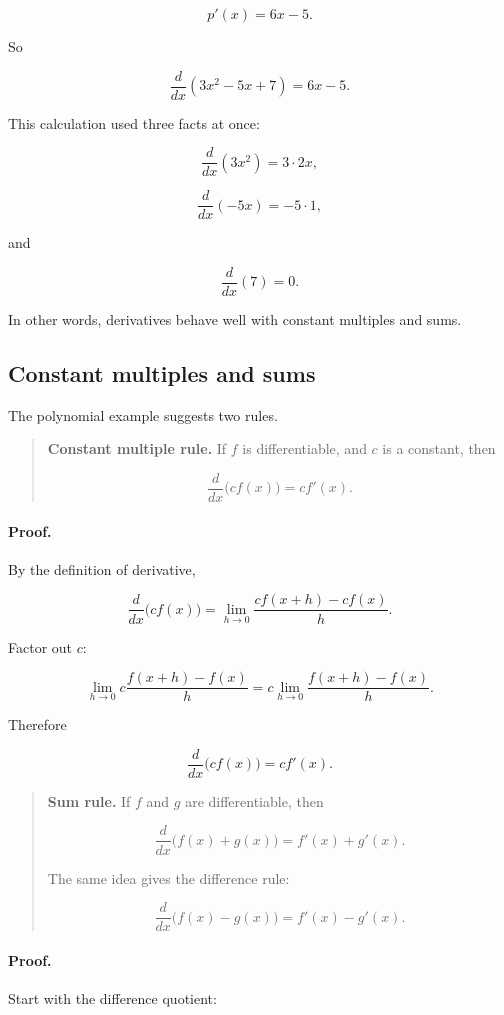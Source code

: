 \[
p'(x)=6x-5.
\]

So

\[
\frac{d}{dx}(3x^2-5x+7)=6x-5.
\]

This calculation used three facts at once:

\[
\frac{d}{dx}(3x^2)=3\cdot 2x,
\]

\[
\frac{d}{dx}(-5x)=-5\cdot 1,
\]

and

\[
\frac{d}{dx}(7)=0.
\]

In other words, derivatives behave well with constant multiples and sums.

\subsection{Constant multiples and sums}
\label{subsec:constant-multiple-sum-rules-first}

The polynomial example suggests two rules.

\begin{quote}
\textbf{Constant multiple rule.}
If \(f\) is differentiable, and \(c\) is a constant, then

\[
\boxed{
\frac{d}{dx}\bigl(c f(x)\bigr)=c f'(x).
}
\]
\end{quote}

\paragraph{Proof.}
By the definition of derivative,

\[
\frac{d}{dx}\bigl(c f(x)\bigr)
=
\lim_{h\to0}\frac{c f(x+h)-c f(x)}{h}.
\]

Factor out \(c\):

\[
\lim_{h\to0}c\frac{f(x+h)-f(x)}{h}
=
c\lim_{h\to0}\frac{f(x+h)-f(x)}{h}.
\]

Therefore

\[
\frac{d}{dx}\bigl(c f(x)\bigr)=c f'(x).
\]

\begin{quote}
\textbf{Sum rule.}
If \(f\) and \(g\) are differentiable, then

\[
\boxed{
\frac{d}{dx}\bigl(f(x)+g(x)\bigr)=f'(x)+g'(x).
}
\]

The same idea gives the difference rule:

\[
\boxed{
\frac{d}{dx}\bigl(f(x)-g(x)\bigr)=f'(x)-g'(x).
}
\]
\end{quote}

\paragraph{Proof.}
Start with the difference quotient:

